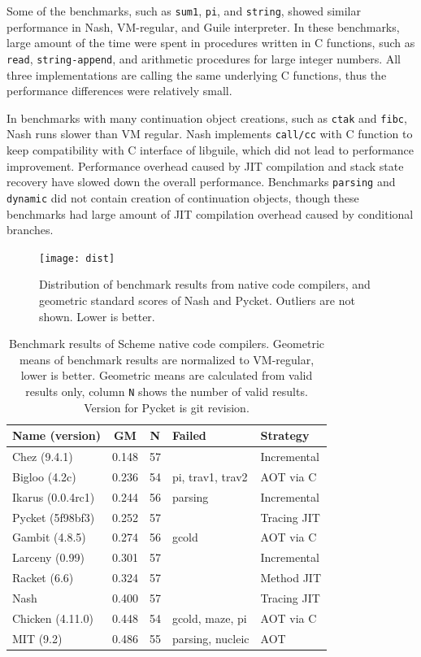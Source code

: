 \documentclass[preprint, 10pt]{sigplanconf}
\begin{document}
Some of the benchmarks, such as \texttt{sum1}, \texttt{pi}, and
\texttt{string}, showed similar performance in Nash, VM-regular, and Guile
interpreter. In these benchmarks, large amount of the time were spent in
procedures written in C functions, such as \texttt{read},
\texttt{string-append}, and arithmetic procedures for large integer numbers.
All three implementations are calling the same underlying C functions, thus
the performance differences were relatively small.

In benchmarks with many continuation object creations, such as \texttt{ctak}
and \texttt{fibc}, Nash runs slower than VM regular. Nash implements
\texttt{call/cc} with C function to keep compatibility with C interface of
libguile, which did not lead to performance improvement.  Performance overhead
caused by JIT compilation and stack state recovery have slowed down the
overall performance.  Benchmarks \texttt{parsing} and \texttt{dynamic} did not
contain creation of continuation objects, though these benchmarks had large
amount of JIT compilation overhead caused by conditional branches.

\begin{figure}
  \centering
  \texttt{[image: dist]}
  \caption{Distribution of benchmark results from native code compilers, and
    geometric standard scores of Nash and Pycket.  Outliers are not
    shown. Lower is better.}
  \label{fig:dist}
\end{figure}

\begin{table}
  \centering
  \begin{tabular}{lccp{11mm}l}
    Name (version) & GM & N & Failed & Strategy \\
    \toprule
    Chez (9.4.1) &  0.148 & 57 & & Incremental \\
    \midrule
    Bigloo (4.2c) & 0.236 & 54 & pi, trav1, trav2 & AOT via C \\
    \midrule
    Ikarus (0.0.4rc1) & 0.244 & 56 & parsing & Incremental \\
    \midrule
    Pycket (5f98bf3) & 0.252 & 57 & & Tracing JIT \\
    \midrule
    Gambit (4.8.5) & 0.274 & 56 & gcold & AOT via C \\
    \midrule
    Larceny (0.99) &  0.301 & 57 & & Incremental \\
    \midrule
    Racket  (6.6) &  0.324 & 57 & & Method JIT \\
    \midrule
    Nash & 0.400 & 57 & & Tracing JIT \\
    \midrule
    Chicken (4.11.0) & 0.448 & 54 & gcold, maze, pi & AOT via C \\
    \midrule
    MIT (9.2) &  0.486 & 55 & parsing, nucleic & AOT \\
  \end{tabular}
  \caption{Benchmark results of Scheme native code compilers. Geometric means
    of benchmark results are normalized to VM-regular, lower is
    better. Geometric means are calculated from valid results only, column
    \texttt{N} shows the number of valid results. Version for Pycket is git
    revision.}
\label{tab:nativecomp}
\end{table}
\end{document}
